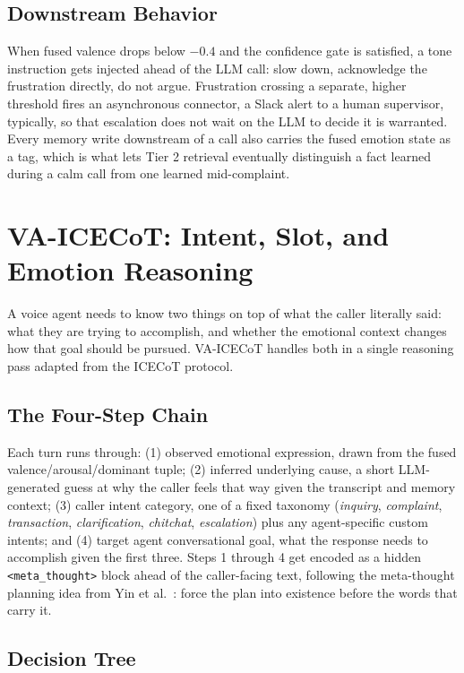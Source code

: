 \documentclass[conference]{IEEEtran}
\begin{document}
\subsection{Downstream Behavior}

When fused valence drops below $-0.4$ and the confidence gate is satisfied, a tone instruction gets injected ahead of the LLM call: slow down, acknowledge the frustration directly, do not argue. Frustration crossing a separate, higher threshold fires an asynchronous connector, a Slack alert to a human supervisor, typically, so that escalation does not wait on the LLM to decide it is warranted. Every memory write downstream of a call also carries the fused emotion state as a tag, which is what lets Tier 2 retrieval eventually distinguish a fact learned during a calm call from one learned mid-complaint.

\section{VA-ICECoT: Intent, Slot, and Emotion Reasoning}
\label{sec:vaicecot}

A voice agent needs to know two things on top of what the caller literally said: what they are trying to accomplish, and whether the emotional context changes how that goal should be pursued. VA-ICECoT handles both in a single reasoning pass adapted from the ICECoT protocol.

\subsection{The Four-Step Chain}

Each turn runs through: (1) observed emotional expression, drawn from the fused valence/arousal/dominant tuple; (2) inferred underlying cause, a short LLM-generated guess at why the caller feels that way given the transcript and memory context; (3) caller intent category, one of a fixed taxonomy (\textit{inquiry}, \textit{complaint}, \textit{transaction}, \textit{clarification}, \textit{chitchat}, \textit{escalation}) plus any agent-specific custom intents; and (4) target agent conversational goal, what the response needs to accomplish given the first three. Steps 1 through 4 get encoded as a hidden \texttt{<meta\_thought>} block ahead of the caller-facing text, following the meta-thought planning idea from Yin et al.~\cite{swi}: force the plan into existence before the words that carry it.

\subsection{Decision Tree}
\end{document}
